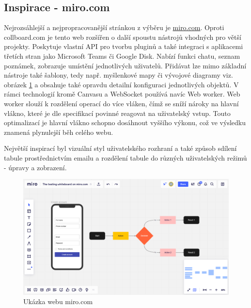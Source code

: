 \subsection{Inspirace - miro.com}
\label{sec:2.6}
Nejrozsáhlejší a nejpropracovanější stránkou z výběru je \underline{miro.com}.
Oproti collboard.com je tento web rozšířen o další spoustu nástrojů vhodných pro větší projekty.
Poskytuje vlastní API pro tvorbu pluginů a také integraci s aplikacemi třetích stran jako Microsoft Teams či Google Disk.
Nabízí funkci chatu, seznam poznámek, zobrazuje umístění jednotlivých uživatelů.
Přidávat lze mimo základní nástroje také šablony, tedy např. myšlenkové mapy či vývojové diagramy viz. obrázek \ref{fig:miro} a obsahuje také opravdu detailní konfiguraci jednotlivých objektů.
V rámci technologií kromě Canvasu a WebSocket používá navíc Web worker.
Web worker slouží k rozdělení operací do více vláken, čímž se sníží nároky na hlavní vlákno, které je dle specifikací povinné reagovat na uživatelský vstup. \cite{web:MDN/MainThread}
Touto optimalizací je hlavní vlákno schopno dosáhnout vyššího výkonu, což ve výsledku znamená plynulejší běh celého webu.

Největší inspirací byl vizuální styl uživatelského rozhraní a také způsob sdílení tabule prostřednictvím emailu a rozdělení tabule do různých uživatelských režimů - úpravy a zobrazení.
\begin{figure}
	\centering
	\includegraphics[width=1\textwidth]{Figures/miro.png}
	\caption{Ukázka webu miro.com}
	\label{fig:miro}
\end{figure}
\endinput
